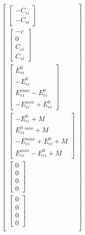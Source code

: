 \documentclass[11pt]{article} %
\begin{document}
\begin{align}
\begin{bmatrix}
\begin{bmatrix}
            -C_{ei} \\
            -C_{si}
        \end{bmatrix} \\
        \begin{bmatrix}
            -c \\
             0 \\
            C_{ei} \\
            C_{si}
        \end{bmatrix}\\
        \begin{bmatrix}
            E_{ei}^{0}\\
            -E_{ei}^{0}\\
            E_{ei}^{max} - E_{ei}^{0}\\
            -E_{ei}^{min} + E_{ei}^{0}
        \end{bmatrix}\\
        \begin{bmatrix}
            -E_{ei}^{0} + M\\
            E_{ei}^{0}^{min} + M\\
            -E_{ei}^{max} + E_{ei}^{0} + M\\
            E_{ei}^{min} - E_{ei}^{0} + M
        \end{bmatrix}\\
        \begin{bmatrix}
            0\\
            0\\
            0\\
            0
        \end{bmatrix}\\
        \begin{bmatrix}
            0\\
            0\\
            0\\
            0
        \end{bmatrix}\\
    \end{bmatrix} 
\end{align}
\end{document}
